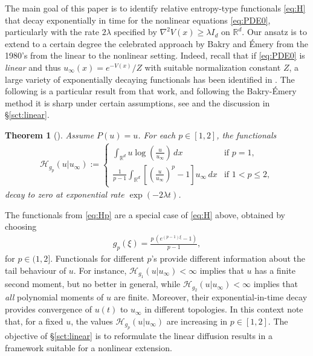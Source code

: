 \documentclass[reqno]{amsart}
\newtheorem{theorem}[lemma]{Theorem}
\newcommand{\R}{\mathbb{R}}
\renewcommand{\H}{{\mathcal{H}}}
\begin{document}
The main goal of this paper is to identify relative entropy-type functionals \eqref{eq:H} that decay exponentially in time for the nonlinear equations \eqref{eq:PDE0}, particularly with the rate $2\lambda$ specified by $\nabla^2 V(x)\ge \lambda I_d$ on $\R^d$. Our ansatz is to extend to a certain degree the celebrated approach by Bakry and Émery from the 1980's from the linear to the nonlinear setting. Indeed, recall that if \eqref{eq:PDE0} is \emph{linear} and thus $u_\infty(x)=e^{-V(x)}/Z$ with suitable normalization constant $Z$, a large variety of exponentially decaying functionals has been identified in \cite{BaEm84}. The following is a particular result from that work, and following the Bakry-\'Emery method it is sharp under certain assumptions, see \cite[Section 3.5]{AMTU} and the discussion in \S\ref{sct:linear}.
%
\begin{theorem}[\cite{BaEm84,BaEm85,BaEm85a, AMTU}]
  \label{thm:BE}
  Assume $P(u)=u$.
  For each $p\in[1,2]$, the functionals
  \begin{align}
    \label{eq:Hp}
    \mathcal H_{g_p}(u|u_\infty) :=
    \begin{cases}
      \displaystyle \int_{\R^d} u\log\left(\frac{u}{u_\infty}\right) \,dx & \text{if $p=1$}, \\[3mm] 
      \displaystyle \frac1{p-1}\int_{\R^d} \left[\left(\frac{u}{u_\infty}\right)^p-1\right]u_\infty\,dx & \text{if $1<p\le2$},
    \end{cases}
  \end{align}
  decay to zero at exponential rate $\exp(-2\lambda t)$.
\end{theorem}
%
The functionals from \eqref{eq:Hp} are a special case of \eqref{eq:H} above, obtained by choosing 
\begin{align}
  \label{eq:gp}
  g_p(\xi)=\frac{p\,\left(e^{(p-1)\xi}-1\right)}{p-1},
\end{align}
for $p\in(1,2]$.
Functionals for different $p$'s provide different information about the tail behaviour of $u$. 
For instance, $\mathcal H_{g_1}(u|u_\infty)<\infty$ implies that $u$ has a finite second moment,
but no better in general,
while $\mathcal H_{g_2}(u|u_\infty)<\infty$ implies that \emph{all} polynomial moments of $u$ are finite. Moreover, their exponential-in-time decay provides convergence of $u(t)$ to $u_\infty$ in different topologies. 
In this context note that, for a fixed $u$, the values $\H_{g_p}(u|u_\infty)$ are increasing in $p\in[1,2]$. The objective of \S\ref{sct:linear} is to reformulate the linear diffusion results in a framework suitable for a nonlinear extension. 
\end{document}
